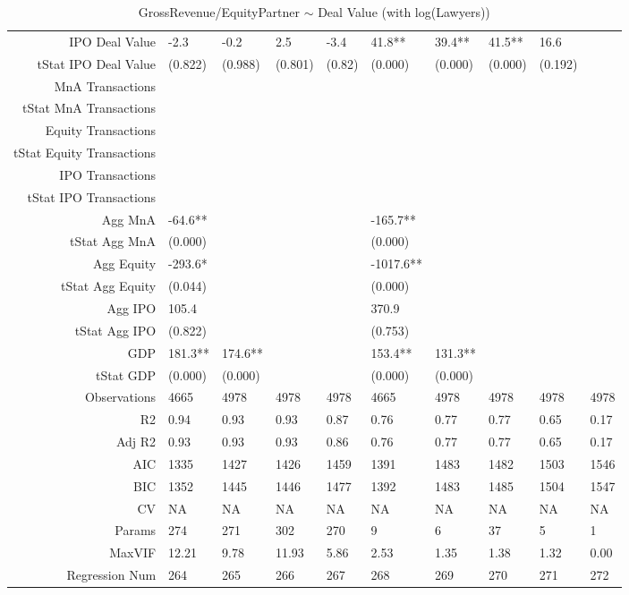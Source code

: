 \begin{table}[ht]
\begin{tabular}{rlllllllll}
  IPO Deal Value & -2.3 & -0.2 & 2.5 & -3.4 & 41.8** & 39.4** & 41.5** & 16.6 &  \\ 
  tStat IPO Deal Value & (0.822) & (0.988) & (0.801) & (0.82) & (0.000) & (0.000) & (0.000) & (0.192) &  \\ 
  MnA Transactions &  &  &  &  &  &  &  &  &  \\ 
  tStat MnA Transactions &  &  &  &  &  &  &  &  &  \\ 
  Equity Transactions &  &  &  &  &  &  &  &  &  \\ 
  tStat Equity Transactions &  &  &  &  &  &  &  &  &  \\ 
  IPO Transactions &  &  &  &  &  &  &  &  &  \\ 
  tStat IPO Transactions &  &  &  &  &  &  &  &  &  \\ 
  Agg MnA & -64.6** &  &  &  & -165.7** &  &  &  &  \\ 
  tStat Agg MnA & (0.000) &  &  &  & (0.000) &  &  &  &  \\ 
  Agg Equity & -293.6* &  &  &  & -1017.6** &  &  &  &  \\ 
  tStat Agg Equity & (0.044) &  &  &  & (0.000) &  &  &  &  \\ 
  Agg IPO & 105.4 &  &  &  & 370.9 &  &  &  &  \\ 
  tStat Agg IPO & (0.822) &  &  &  & (0.753) &  &  &  &  \\ 
  GDP & 181.3** & 174.6** &  &  & 153.4** & 131.3** &  &  &  \\ 
  tStat GDP & (0.000) & (0.000) &  &  & (0.000) & (0.000) &  &  &  \\ 
  Observations & 4665 & 4978 & 4978 & 4978 & 4665 & 4978 & 4978 & 4978 & 4978 \\ 
  R2 & 0.94 & 0.93 & 0.93 & 0.87 & 0.76 & 0.77 & 0.77 & 0.65 & 0.17 \\ 
  Adj R2 & 0.93 & 0.93 & 0.93 & 0.86 & 0.76 & 0.77 & 0.77 & 0.65 & 0.17 \\ 
  AIC & 1335 & 1427 & 1426 & 1459 & 1391 & 1483 & 1482 & 1503 & 1546 \\ 
  BIC & 1352 & 1445 & 1446 & 1477 & 1392 & 1483 & 1485 & 1504 & 1547 \\ 
  CV & NA & NA & NA & NA & NA & NA & NA & NA & NA \\ 
  Params & 274 & 271 & 302 & 270 & 9 & 6 & 37 & 5 & 1 \\ 
  MaxVIF & 12.21 & 9.78 & 11.93 & 5.86 & 2.53 & 1.35 & 1.38 & 1.32 & 0.00 \\ 
  Regression Num & 264 & 265 & 266 & 267 & 268 & 269 & 270 & 271 & 272 \\ 
   \hline
\end{tabular}
\caption{GrossRevenue/EquityPartner $\sim$ Deal Value (with log(Lawyers))} 
\end{table}
